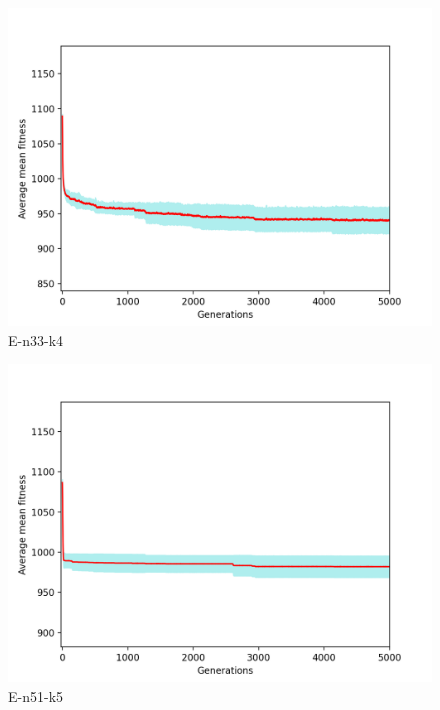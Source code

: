 \documentclass[conference,compsoc]{IEEEtran}
\begin{document}
\begin{figure}[h!]
    \centering
    \includegraphics[scale=0.35]{E-n33-k4-mean}
    \caption{E-n33-k4}
    \label{fig:my_label}
\end{figure}
\newpage
\begin{figure}[h!]
    \centering
    \includegraphics[scale=0.35]{E-n51-k5-mean}
    \caption{E-n51-k5}
    \label{fig:my_label}
\end{figure}
\end{document}
